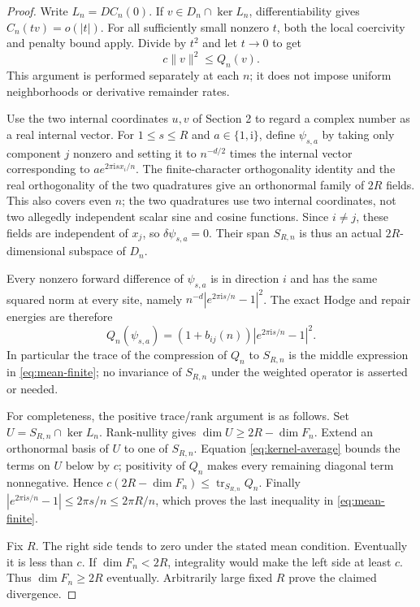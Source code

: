 \begin{proof}
Write $L_n=DC_n(0)$. If $v\in D_n\cap\ker L_n$, differentiability gives
$C_n(tv)=o(|t|)$. For all sufficiently small nonzero $t$, both the local
coercivity and penalty bound apply. Divide by $t^2$ and let $t\to0$ to get
\begin{equation}\label{eq:kernel-average}
 c\|v\|^2\leq Q_n(v).
\end{equation}
This argument is performed separately at each $n$; it does not impose
uniform neighborhoods or derivative remainder rates.

Use the two internal coordinates $u,v$ of Section 2 to regard a complex
number as a real internal vector. For $1\leq s\leq R$ and $a\in\{1,\mathrm{i}\}$,
define $\psi_{s,a}$ by taking only component $j$ nonzero and setting it to
$n^{-d/2}$ times the internal vector corresponding to
$a e^{2\pi\mathrm{i}s x_i/n}$. The finite-character orthogonality identity
and the real orthogonality of the two quadratures give an orthonormal
family of $2R$ fields. This also covers even $n$; the two quadratures use
two internal coordinates, not two allegedly independent scalar sine and
cosine functions. Since $i\ne j$, these fields are independent of $x_j$,
so $\delta\psi_{s,a}=0$. Their span $S_{R,n}$ is thus an actual
$2R$-dimensional subspace of $D_n$.

Every nonzero forward difference of $\psi_{s,a}$ is in direction $i$ and
has the same squared norm at every site, namely
$n^{-d}|e^{2\pi\mathrm{i}s/n}-1|^2$. The exact Hodge and repair energies are
therefore
\[
 Q_n(\psi_{s,a})=(1+b_{ij}(n))|e^{2\pi\mathrm{i}s/n}-1|^2.
\]
In particular the trace of the compression of $Q_n$ to $S_{R,n}$ is the
middle expression in \eqref{eq:mean-finite}; no invariance of $S_{R,n}$
under the weighted operator is asserted or needed.

For completeness, the positive trace/rank argument is as follows. Set
$U=S_{R,n}\cap\ker L_n$. Rank-nullity gives
$\dim U\geq2R-\dim F_n$. Extend an orthonormal basis of $U$ to one of
$S_{R,n}$. Equation \eqref{eq:kernel-average} bounds the terms on $U$
below by $c$; positivity of $Q_n$ makes every remaining diagonal term
nonnegative. Hence $c(2R-\dim F_n)\leq\operatorname{tr}_{S_{R,n}}Q_n$.
Finally $|e^{2\pi\mathrm{i}s/n}-1|\leq2\pi s/n\leq2\pi R/n$, which proves
the last inequality in \eqref{eq:mean-finite}.

Fix $R$. The right side tends to zero under the stated mean condition.
Eventually it is less than $c$. If $\dim F_n<2R$, integrality would make
the left side at least $c$. Thus $\dim F_n\geq2R$ eventually. Arbitrarily
large fixed $R$ prove the claimed divergence.
\end{proof}

